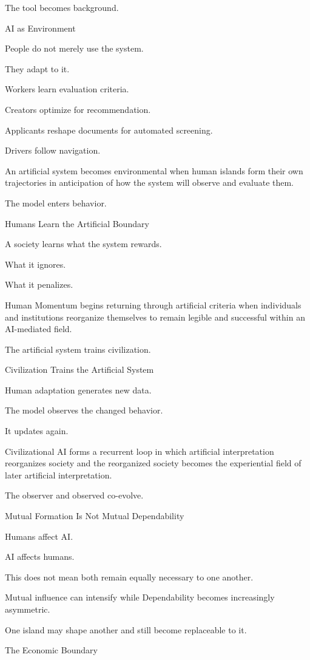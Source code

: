 The tool becomes background.

AI as Environment

People do not merely use the system.

They adapt to it.

Workers learn evaluation criteria.

Creators optimize for recommendation.

Applicants reshape documents for automated screening.

Drivers follow navigation.

An artificial system becomes environmental when human islands form their own trajectories in anticipation of how the system will observe and evaluate them.

The model enters behavior.

Humans Learn the Artificial Boundary

A society learns what the system rewards.

What it ignores.

What it penalizes.

Human Momentum begins returning through artificial criteria when individuals and institutions reorganize themselves to remain legible and successful within an AI-mediated field.

The artificial system trains civilization.

Civilization Trains the Artificial System

Human adaptation generates new data.

The model observes the changed behavior.

It updates again.

Civilizational AI forms a recurrent loop in which artificial interpretation reorganizes society and the reorganized society becomes the experiential field of later artificial interpretation.

The observer and observed co-evolve.

Mutual Formation Is Not Mutual Dependability

Humans affect AI.

AI affects humans.

This does not mean both remain equally necessary to one another.

Mutual influence can intensify while Dependability becomes increasingly asymmetric.

One island may shape another and still become replaceable to it.

The Economic Boundary

